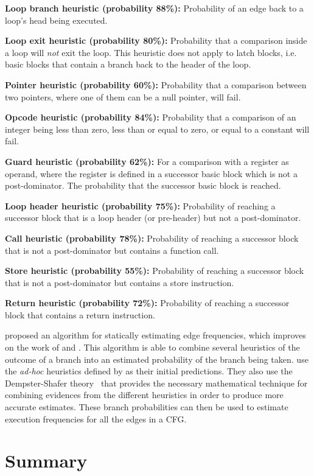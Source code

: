 \noindent\textbf{Loop branch heuristic (probability 88\%):} Probability of an edge back to a loop's head being executed.

\noindent\textbf{Loop exit heuristic (probability 80\%):} Probability that a comparison inside a loop will \textit{not} exit the loop. This heuristic does not apply to latch blocks, i.e. basic blocks that contain a branch back to the header of the loop.

\noindent\textbf{Pointer heuristic (probability 60\%):} Probability that a comparison between two pointers, where one of them can be a null pointer, will fail.

\noindent\textbf{Opcode heuristic (probability 84\%):} Probability that a comparison of an integer being less than zero, less than or equal to zero, or equal to a constant will fail.

\noindent\textbf{Guard heuristic (probability 62\%):} For a comparison with a register as operand, where the register is defined in a successor basic block which is not a post-dominator. The probability that the successor basic block is reached.

\noindent\textbf{Loop header heuristic (probability 75\%):} Probability of reaching a successor block that is a loop header (or pre-header) but not a post-dominator.

\noindent\textbf{Call heuristic (probability 78\%):} Probability of reaching a successor block that is not a post-dominator but contains a function call.

\noindent\textbf{Store heuristic (probability 55\%):} Probability of reaching a successor block that is not a post-dominator but contains a store instruction.

\noindent\textbf{Return heuristic (probability 72\%):} Probability of reaching a successor block that contains a return instruction.


\cite{wu94} proposed an algorithm for statically estimating edge frequencies, which improves on the work of \cite{wagner94} and \cite{ball93}.
This algorithm is able to combine several heuristics of the outcome of a branch into an estimated probability of the branch being taken.
\cite{wu94} use the \textit{ad-hoc} heuristics defined by \cite{ball93} as their initial predictions.
They also use the Dempster-Shafer theory~\citep{shafer76} that provides the necessary mathematical technique for combining evidences from the different heuristics in order to produce more accurate estimates.
These branch probabilities can then be used to estimate execution frequencies for all the edges in a CFG.

\section{Summary}

